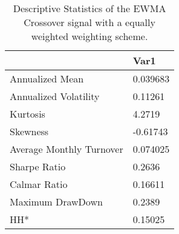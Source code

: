 \begin{table}[H]
\centering
\begin{tabular}{ll}
& Var1 \\ 
\hline 
Annualized Mean & 0.039683 \\ 
Annualized Volatility & 0.11261 \\ 
Kurtosis & 4.2719 \\ 
Skewness & -0.61743 \\ 
Average Monthly Turnover & 0.074025 \\ 
Sharpe Ratio & 0.2636 \\ 
Calmar Ratio & 0.16611 \\ 
Maximum DrawDown & 0.2389 \\ 
HH* & 0.15025 \\ 
\hline
\end{tabular}
\caption{Descriptive Statistics of the EWMA Crossover signal with a equally weighted weighting scheme.}
\label{MBBSEWOQ}
\end{table}